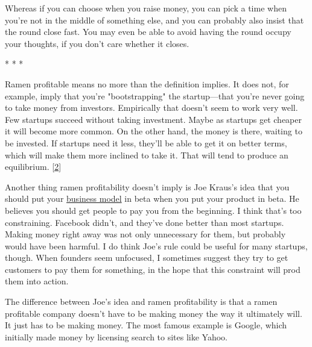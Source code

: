 Whereas
                    if you can choose when you raise money, you can pick a time
                    when you're not in the middle of something else, and you can
                    probably also insist that the round close fast. You may even
                    be able to avoid having the round occupy your thoughts, if
                    you don't care whether it closes.


                    * * *
                    

Ramen profitable means no more than the
                    definition implies. It does not, for example, imply that
                    you're "bootstrapping" the startup---that you're never
                    going to take money from investors. Empirically that doesn't
                    seem to work very well. Few startups succeed without taking
                    investment. Maybe as startups get cheaper it will become
                    more common. On the other hand, the money is there, waiting
                    to be invested. If startups need it less, they'll be able to
                    get it on better terms, which will make them more inclined
                    to take it. That will tend to produce an equilibrium.
                    [\href{\#f2n}{2}]

Another thing ramen profitability doesn't imply
                    is Joe Kraus's idea that you should put your
                    \href{http://www.brendonwilson.com/blog/2006/04/30/joe-kraus-confessions-of-a-startup-addict/}{business model}
                    in beta when you put your product in beta. He believes you
                    should get people to pay you from the beginning. I think
                    that's too constraining. Facebook didn't, and they've done
                    better than most startups. Making money right away was not
                    only unnecessary for them, but probably would have been
                    harmful. I do think Joe's rule could be useful for many
                    startups, though. When founders seem unfocused, I sometimes
                    suggest they try to get customers to pay them for something,
                    in the hope that this constraint will prod them into
                    action.

The difference between Joe's idea and
                    ramen profitability is that a ramen profitable company
                    doesn't have to be making money the way it ultimately will.
                    It just has to be making money. The most famous example is
                    Google, which initially made money by licensing search to
                    sites like Yahoo.


